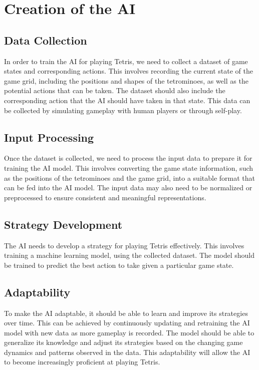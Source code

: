 \documentclass[conference]{IEEEtran}
\begin{document}
\section*{Creation of the AI}

\subsection{Data Collection}
In order to train the AI for playing Tetris, we need to collect a dataset of game states and corresponding actions. This involves recording the current state of the game grid, including the positions and shapes of the tetrominoes, as well as the potential actions that can be taken. The dataset should also include the corresponding action that the AI should have taken in that state. This data can be collected by simulating gameplay with human players or through self-play.
\subsection{Input Processing}
Once the dataset is collected, we need to process the input data to prepare it for training the AI model. This involves converting the game state information, such as the positions of the tetrominoes and the game grid, into a suitable format that can be fed into the AI model. The input data may also need to be normalized or preprocessed to ensure consistent and meaningful representations.
\subsection{Strategy Development}
The AI needs to develop a strategy for playing Tetris effectively. This involves training a machine learning model, using the collected dataset. The model should be trained to predict the best action to take given a particular game state.
\subsection{Adaptability}
To make the AI adaptable, it should be able to learn and improve its strategies over time. This can be achieved by continuously updating and retraining the AI model with new data as more gameplay is recorded. The model should be able to generalize its knowledge and adjust its strategies based on the changing game dynamics and patterns observed in the data. This adaptability will allow the AI to become increasingly proficient at playing Tetris.
\end{document}
